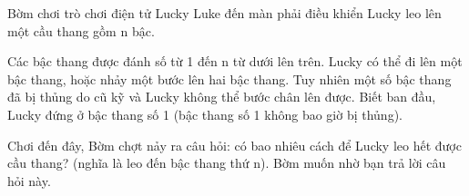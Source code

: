 Bờm chơi trò chơi điện tử Lucky Luke đến màn phải điều khiển Lucky leo lên một cầu thang gồm n bậc.

Các bậc thang được đánh số từ 1 đến n từ dưới lên trên. Lucky có thể đi lên một bậc thang, hoặc nhảy một bước lên hai bậc thang. Tuy nhiên một số bậc thang đã bị thủng do cũ kỹ và Lucky không thể bước chân lên được. Biết ban đầu, Lucky đứng ở bậc thang số 1 (bậc thang số 1 không bao giờ bị thủng).

Chơi đến đây, Bờm chợt nảy ra câu hỏi: có bao nhiêu cách để Lucky leo hết được cầu thang? (nghĩa là leo đến bậc thang thứ n). Bờm muốn nhờ bạn trả lời câu hỏi này.

\